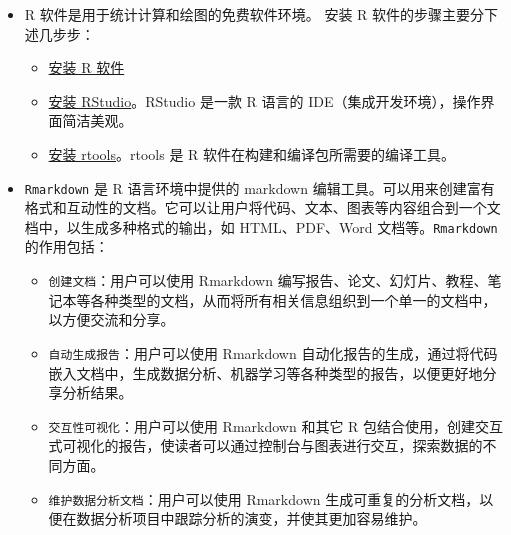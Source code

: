 \documentclass[
]{book}
\begin{document}
\begin{itemize}
\item
  R 软件是用于统计计算和绘图的免费软件环境。
  安装 R 软件的步骤主要分下述几步步：

  \begin{itemize}
  \item
    \href{https://cran.r-project.org/}{安装 R 软件}
  \item
    \href{https://posit.co/download/rstudio-desktop/}{安装 RStudio}。RStudio 是一款 R 语言的 IDE（集成开发环境），操作界面简洁美观。
  \item
    \href{https://mirrors.tuna.tsinghua.edu.cn/CRAN/}{安装 rtools}。rtools 是 R 软件在构建和编译包所需要的编译工具。
  \end{itemize}
\item
  \texttt{Rmarkdown} 是 R 语言环境中提供的 markdown 编辑工具。可以用来创建富有格式和互动性的文档。它可以让用户将代码、文本、图表等内容组合到一个文档中，以生成多种格式的输出，如 HTML、PDF、Word 文档等。\texttt{Rmarkdown} 的作用包括：

  \begin{itemize}
  \item
    \texttt{创建文档}：用户可以使用 Rmarkdown 编写报告、论文、幻灯片、教程、笔记本等各种类型的文档，从而将所有相关信息组织到一个单一的文档中，以方便交流和分享。
  \item
    \texttt{自动生成报告}：用户可以使用 Rmarkdown 自动化报告的生成，通过将代码嵌入文档中，生成数据分析、机器学习等各种类型的报告，以便更好地分享分析结果。
  \item
    \texttt{交互性可视化}：用户可以使用 Rmarkdown 和其它 R 包结合使用，创建交互式可视化的报告，使读者可以通过控制台与图表进行交互，探索数据的不同方面。
  \item
    \texttt{维护数据分析文档}：用户可以使用 Rmarkdown 生成可重复的分析文档，以便在数据分析项目中跟踪分析的演变，并使其更加容易维护。
  \end{itemize}
\end{itemize}

  
\end{document}
